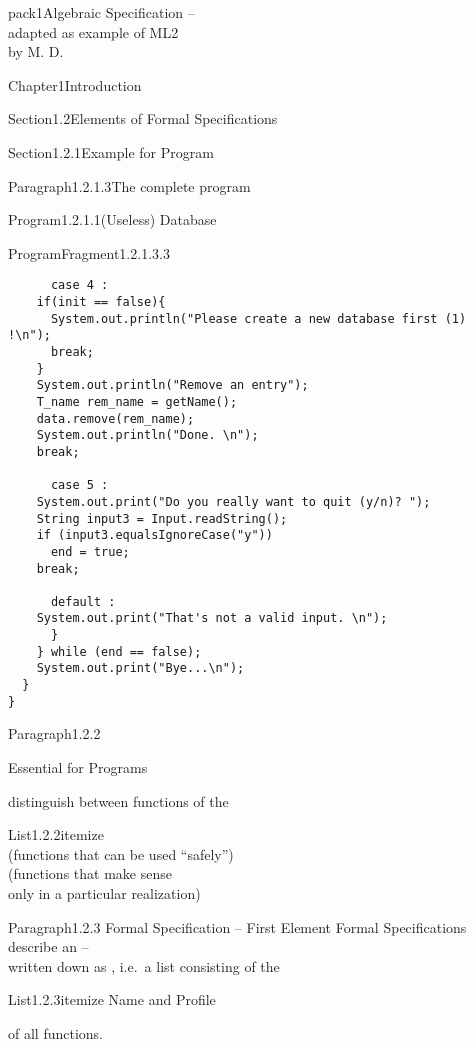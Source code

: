 \documentclass[landscape, slides, light]{mmiss2}
\begin{document}
\begin{Package}{pack1}{Algebraic
Specification -- \\ adapted as example of ML2\\ by M. D.}
\begin{Section}{Chapter1}{Introduction}
\begin{Section}{Section1.2}{Elements of Formal Specifications}{}
\begin{Section}{Section1.2.1}{Example for Program}{}
\begin{Paragraph}{Paragraph1.2.1.3}{The complete program}{}
\begin{Program}{Program1.2.1.1}{(Useless) Database}{}
\begin{ProgramFragment}{ProgramFragment1.2.1.3.3}{}{}
\begin{verbatim}
      case 4 :
	if(init == false){
	  System.out.println("Please create a new database first (1) !\n");
	  break;
	}
	System.out.println("Remove an entry");  
	T_name rem_name = getName();
	data.remove(rem_name);
	System.out.println("Done. \n");
	break;

      case 5 :
	System.out.print("Do you really want to quit (y/n)? ");
	String input3 = Input.readString();
	if (input3.equalsIgnoreCase("y"))
	  end = true;
	break;

      default :
	System.out.print("That's not a valid input. \n");
      }
    } while (end == false);
    System.out.print("Bye...\n");
  }
}

\end{verbatim}
\normalsize
\end{ProgramFragment}
\end{Program}
\end{Paragraph}
\end{Section}

\begin{Paragraph}{Paragraph1.2.2}{}{}
\begin{center}
{\Large Essential for Programs}
\end{center}
distinguish between functions of the
\begin{List}{List1.2.2}{itemize}{}
\ListItem{}
{ \\ (functions that can be used
``safely'')}
\ListItem{}
{ \\ (functions that make sense \\
           only in a particular realization)}
\end{List}
\end{Paragraph}

\begin{Paragraph}{Paragraph1.2.3}{ Formal Specification -- First Element}{}
Formal Specifications describe an  -- \\
written down as , i.e.~a list consisting of the\\
\begin{List}{List1.2.3}{itemize}{}
\ListItem{}
{Name and}
\ListItem{}
{Profile}
\end{List}
of all functions.
\end{Paragraph}


\end{Section}
\end{Section}
\end{Package}
\end{document}

